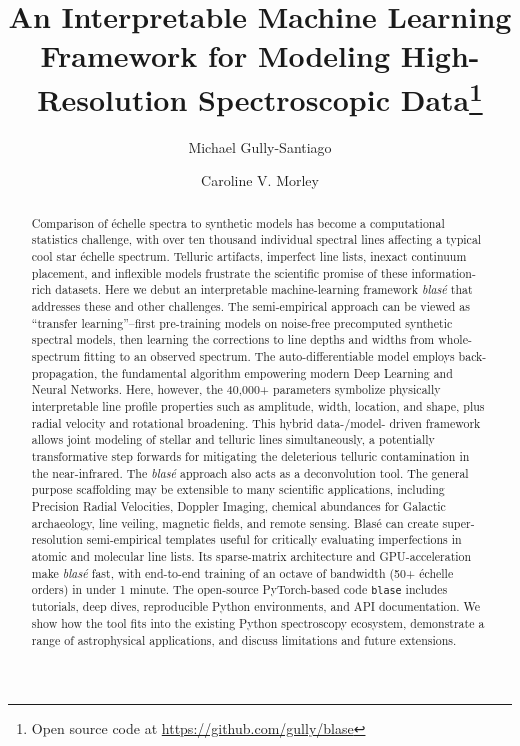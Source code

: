 \documentclass[twocolumn]{aastex631}
\begin{document}
\title{An Interpretable Machine Learning Framework for Modeling High-Resolution Spectroscopic Data\footnote{Open source code at \url{https://github.com/gully/blase}}}

\author{Michael Gully-Santiago}

\author{Caroline V. Morley}

\begin{abstract}

    Comparison of \'echelle spectra to synthetic models has become a computational statistics challenge, with over ten thousand individual spectral lines affecting a typical cool star \'echelle spectrum.  Telluric artifacts, imperfect line lists, inexact continuum placement, and inflexible models frustrate the scientific promise of these information-rich datasets.  Here we debut an interpretable machine-learning framework \emph{blas\'e} that addresses these and other challenges.  The semi-empirical approach can be viewed as ``transfer learning''--first pre-training models on noise-free precomputed synthetic spectral models, then learning the corrections to line depths and widths from whole-spectrum fitting to an observed spectrum.  The auto-differentiable model employs back-propagation, the fundamental algorithm empowering modern Deep Learning and Neural Networks. Here, however, the 40,000+ parameters symbolize physically interpretable line profile properties such as amplitude, width, location, and shape, plus radial velocity and rotational broadening.  This hybrid data-/model- driven framework allows joint modeling of stellar and telluric lines simultaneously, a potentially transformative step forwards for mitigating the deleterious telluric contamination in the near-infrared.  The \emph{blas\'e} approach also acts as a deconvolution tool. The general purpose scaffolding may be extensible to many scientific applications, including Precision Radial Velocities, Doppler Imaging, chemical abundances for Galactic archaeology, line veiling, magnetic fields, and remote sensing.  Blas\'e can create super-resolution semi-empirical templates useful for critically evaluating imperfections in atomic and molecular line lists.  Its sparse-matrix architecture and GPU-acceleration make \emph{blas\'e} fast, with end-to-end training of an octave of bandwidth (50+ \'echelle orders) in under 1 minute.  The open-source PyTorch-based code \texttt{blase} includes tutorials, deep dives, reproducible Python environments, and API documentation.  We show how the tool fits into the existing Python spectroscopy ecosystem, demonstrate a range of astrophysical applications, and discuss limitations and future extensions.


\end{abstract}
\end{document}
